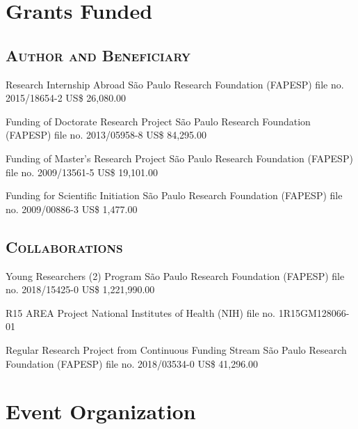 \documentclass[11pt, letterpaper, sans]{moderncv}
\begin{document}

\section{Grants Funded}

\vspace{.5em}
	\subsection{\textsc{Author and Beneficiary}}
\vspace{.5em}

{Research Internship Abroad}
{São Paulo Research Foundation (FAPESP)}
{file no. 2015/18654-2}
{US\$ 26,080.00}{}

{Funding of Doctorate Research Project}
{São Paulo Research Foundation (FAPESP)}
{file no. 2013/05958-8}
{US\$ 84,295.00}{}

{Funding of Master's Research Project}
{São Paulo Research Foundation (FAPESP)}
{file no. 2009/13561-5}
{US\$ 19,101.00}{}

{Funding for Scientific Initiation}
{São Paulo Research Foundation (FAPESP)}
{file no. 2009/00886-3}
{US\$ 1,477.00}{}

\vspace{.5em}
	\subsection{\textsc{Collaborations}}
\vspace{.5em}

{Young Researchers (2) Program}
{São Paulo Research Foundation (FAPESP)}
{file no. 2018/15425-0}
{US\$ 1,221,990.00}{}

{R15 AREA Project}
{National Institutes of Health (NIH)}
{file no. 1R15GM128066-01}
{}{}

{Regular Research Project from Continuous Funding Stream}
{São Paulo Research Foundation (FAPESP)}
{file no. 2018/03534-0}
{US\$ 41,296.00}{}

\clearpage



\section{Event Organization}
\end{document}
